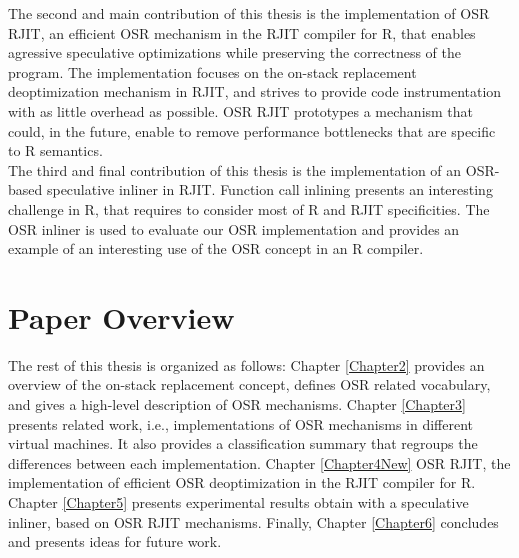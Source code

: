 The second and main contribution of this thesis is the implementation of OSR RJIT, an efficient OSR mechanism in the RJIT compiler for R, that enables agressive speculative optimizations while preserving the correctness of the program.
The implementation focuses on the on-stack replacement deoptimization mechanism in RJIT, and strives to provide code instrumentation with as little overhead as possible.
OSR RJIT prototypes a mechanism that could, in the future, enable to remove performance bottlenecks that are specific to R semantics.\\

The third and final contribution of this thesis is the implementation of an OSR-based speculative inliner in RJIT.
Function call inlining presents an interesting challenge in R, that requires to consider most of R and RJIT specificities.
The OSR inliner is used to evaluate our OSR implementation and provides an example of an interesting use of the OSR concept in an R compiler.\\

\section{Paper Overview}

The rest of this thesis is organized as follows: Chapter \ref{Chapter2} provides an overview of the on-stack replacement concept, defines OSR related vocabulary, and gives a high-level description of OSR mechanisms.
Chapter \ref{Chapter3} presents related work, i.e., implementations of OSR mechanisms in different virtual machines. It also provides a classification summary that regroups the differences between each implementation.
Chapter \ref{Chapter4New} OSR RJIT, the implementation of efficient OSR deoptimization in the RJIT compiler for R.
Chapter \ref{Chapter5} presents experimental results obtain with a speculative inliner, based on OSR RJIT mechanisms.
Finally, Chapter \ref{Chapter6} concludes and presents ideas for future work.\\ 





